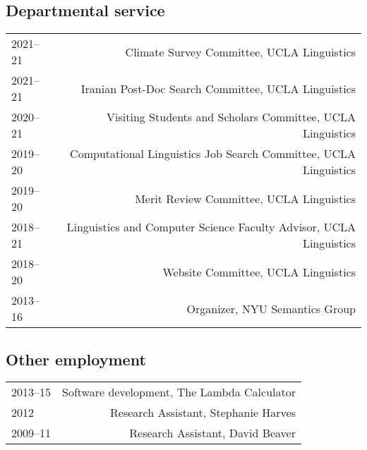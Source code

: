 \documentclass[12pt]{article}
\begin{document}
\subsection*{Departmental service}

\begin{longtable}{LR}
  2021--21   & Climate Survey Committee, UCLA Linguistics\\
  2021--21   & Iranian Post-Doc Search Committee, UCLA Linguistics\\
  2020--21   & Visiting Students and Scholars Committee, UCLA Linguistics\\
  2019--20   & Computational Linguistics Job Search Committee, UCLA Linguistics\\
  2019--20   & Merit Review Committee, UCLA Linguistics\\
  2018--21   & Linguistics and Computer Science Faculty Advisor, UCLA Linguistics\\
  2018--20   & Website Committee, UCLA Linguistics\\
  2013--16   & Organizer, NYU Semantics Group
\end{longtable}

\subsection*{Other employment}
\begin{longtable}{LR}
  2013--15   & Software development, The Lambda Calculator
               \\
  2012       & Research Assistant, Stephanie Harves\\
  2009--11   & Research Assistant, David Beaver
\end{longtable}


\end{document}

